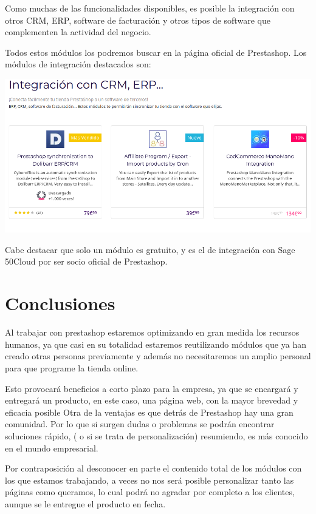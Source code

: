 \documentclass{article}
\begin{document}
Como muchas de las funcionalidades disponibles, es posible la integración con otros CRM, ERP, software de facturación y otros tipos de software que complementen la actividad del negocio.

Todos estos módulos los podremos buscar en la página oficial de Prestashop. Los módulos de integración destacados son:

\begin{center}
\includegraphics[scale=0.4]{images/integracion.png}
\end{center}

Cabe destacar que solo un módulo es gratuito, y es el de integración con Sage 50Cloud por ser socio oficial de Prestashop.

\section{Conclusiones}

Al trabajar con prestashop estaremos optimizando en gran medida los recursos humanos, ya que casi en su totalidad estaremos reutilizando módulos que ya han creado otras personas previamente y además no necesitaremos un amplio personal para que programe la tienda online.

Esto provocará beneficios a corto plazo para la empresa, ya que se encargará y entregará un producto, en este caso, una página web, con la mayor brevedad y eficacia posible
Otra de la ventajas es que detrás de Prestashop hay una gran comunidad. Por lo que si surgen dudas o problemas se podrán encontrar soluciones rápido, ( o si se trata de  personalización)  resumiendo,  es más conocido en el mundo empresarial. 

Por contraposición al desconocer en parte el contenido total de los módulos con los que estamos trabajando, a veces no nos será posible personalizar tanto las páginas como queramos, lo cual podrá no agradar por completo a los clientes, aunque se le entregue el producto en fecha.
\end{document}
